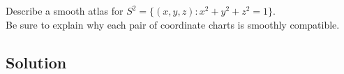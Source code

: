 \documentclass[12pt]{quiz}
\begin{document}
\maketitle

\noindent
Describe a smooth atlas for $S^2 = \{ (x,y,z) : x^2 + y^2 + z^2 = 1
\}$.  \\
Be sure to explain why each pair of coordinate charts is
smoothly compatible.

\subsection*{Solution}

\pagebreak
\null
\end{document}
